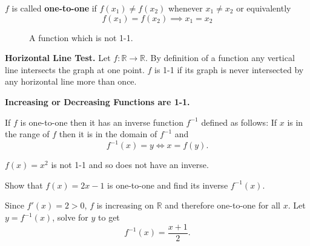 \documentclass[../main.tex]{subfiles}
\begin{document}
\begin{definition}
    $f$ is called \textbf{one-to-one} if $f(x_1) \neq f(x_2)$ whenever $x_1 \neq x_2$ or equivalently
    \[
        f(x_1) = f(x_2) \implies x_1 = x_2
    \]
\end{definition}

\begin{figure}[H]
 \centering
 \caption{A function which is not 1-1.}
\end{figure}

\textbf{Horizontal Line Test.}
Let $f: \mathbb{R} \to \mathbb{R}$. By definition of a function any vertical line intersects the graph at one point. $f$ is 1-1 if its graph is never intersected by any horizontal line more than once.

\textbf{Increasing or Decreasing Functions are 1-1.}

\begin{definition}
    If $f$ is one-to-one then it has an inverse function $f^{-1}$ defined as follows: If $x$ is in the range of $f$ then it is in the domain of $f^{-1}$ and
    \[
        f^{-1}(x) = y \iff x = f(y).
    \]
\end{definition}

\begin{example}
    $f(x) = x^2$ is not 1-1 and so does not have an inverse.
\end{example}

\begin{example}
    Show that $f(x) = 2x -1$ is one-to-one and find its inverse $f^{-1}(x)$.
\end{example}
\begin{solution}
    Since $f'(x) = 2 >0$, $f$ is increasing on $\mathbb{R}$ and therefore one-to-one for all $x$. Let $y = f^{-1}(x)$, solve for $y$ to get
    \[
        f^{-1}(x) = \frac{x+1}{2}.
    \]
\end{solution}
\end{document}
